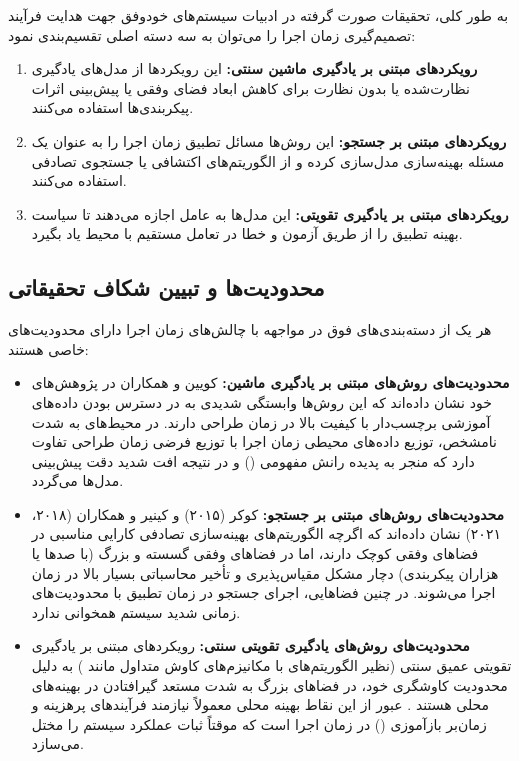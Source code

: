 \documentclass[oneside,openany,phd]{TMU-Thesis}
\begin{document}
به طور کلی، تحقیقات صورت گرفته در ادبیات سیستم‌های خودوفق جهت هدایت فرآیند تصمیم‌گیری زمان اجرا را می‌توان به سه دسته اصلی تقسیم‌بندی نمود:
\begin{enumerate}
    \item \textbf{رویکردهای مبتنی بر یادگیری ماشین سنتی:} این رویکردها از مدل‌های یادگیری نظارت‌شده یا بدون نظارت برای کاهش ابعاد فضای وفقی یا پیش‌بینی اثرات پیکربندی‌ها استفاده می‌کنند.
    \item \textbf{رویکردهای مبتنی بر جستجو:} این روش‌ها مسائل تطبیق زمان اجرا را به عنوان یک مسئله بهینه‌سازی مدل‌سازی کرده و از الگوریتم‌های اکتشافی یا جستجوی تصادفی استفاده می‌کنند.
    \item \textbf{رویکردهای مبتنی بر یادگیری تقویتی:} این مدل‌ها به عامل اجازه می‌دهند تا سیاست بهینه تطبیق را از طریق آزمون و خطا در تعامل مستقیم با محیط یاد بگیرد.
\end{enumerate}

\subsection*{محدودیت‌ها و تبیین شکاف تحقیقاتی}

هر یک از دسته‌بندی‌های فوق در مواجهه با چالش‌های زمان اجرا دارای محدودیت‌های خاصی هستند:
\begin{itemize}
    \item \textbf{محدودیت‌های روش‌های مبتنی بر یادگیری ماشین:} کویین و همکاران در پژوهش‌های خود \cite{quin2019efficient, quin2022reducing} نشان داده‌اند که این روش‌ها وابستگی شدیدی به در دسترس بودن داده‌های آموزشی برچسب‌دار با کیفیت بالا در زمان طراحی دارند. در محیط‌های به شدت نامشخص، توزیع داده‌های محیطی زمان اجرا با توزیع فرضی زمان طراحی تفاوت دارد که منجر به پدیده رانش مفهومی () \cite{gheibi2024dealing} و در نتیجه افت شدید دقت پیش‌بینی مدل‌ها می‌گردد.
    \item \textbf{محدودیت‌های روش‌های مبتنی بر جستجو:} کوکر (۲۰۱۵) \cite{coker2015sass} و کینیر و همکاران (۲۰۱۸، ۲۰۲۱) \cite{kinneer2018managing, kinneer2021information} نشان داده‌اند که اگرچه الگوریتم‌های بهینه‌سازی تصادفی کارایی مناسبی در فضاهای وفقی کوچک دارند، اما در فضاهای وفقی گسسته و بزرگ (با صدها یا هزاران پیکربندی) دچار مشکل مقیاس‌پذیری و تأخیر محاسباتی بسیار بالا در زمان اجرا می‌شوند. در چنین فضاهایی، اجرای جستجو در زمان تطبیق با محدودیت‌های زمانی شدید سیستم همخوانی ندارد.
    \item \textbf{محدودیت‌های روش‌های یادگیری تقویتی سنتی:} رویکردهای مبتنی بر یادگیری تقویتی عمیق سنتی (نظیر الگوریتم‌های  با مکانیزم‌های کاوش متداول مانند ) به دلیل محدودیت کاوشگری خود، در فضاهای بزرگ به شدت مستعد گیرافتادن در بهینه‌های محلی هستند \cite{kim2009reinforcement, metzger2022realizing}. عبور از این نقاط بهینه محلی معمولاً نیازمند فرآیندهای پرهزینه و زمان‌بر بازآموزی () در زمان اجرا است که موقتاً ثبات عملکرد سیستم را مختل می‌سازد.
\end{itemize}
\end{document}
